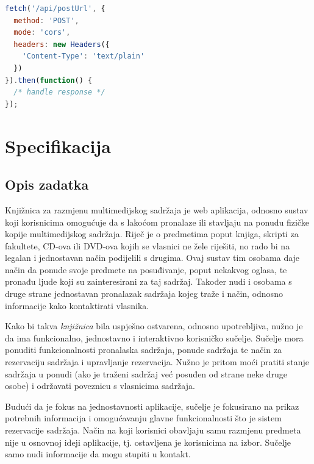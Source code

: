 \documentclass[times, utf8, zavrsni, numeric]{fer}
\newcommand{\razmakp}{\vspace{18pt}}
\newcommand{\razmaks}{\vspace{10pt}}
\begin{document}
\razmakp
\begin{lstlisting}[language=JavaScript, caption={Primjer slanja resursa s Fetch API}, label={lst:fetch_post}]
fetch('/api/postUrl', {
  method: 'POST', 
  mode: 'cors', 
  headers: new Headers({
    'Content-Type': 'text/plain'
  })
}).then(function() {
  /* handle response */
});
\end{lstlisting}
\razmaks



\chapter{Specifikacija}

\section{Opis zadatka}

Knjižnica za razmjenu multimedijskog sadržaja je web aplikacija, odnosno sustav koji korisnicima omogućuje da s lakoćom pronalaze ili stavljaju na ponudu fizičke kopije multimedijskog sadržaja.
Riječ je o predmetima poput knjiga, skripti za fakultete, CD-ova ili DVD-ova kojih se vlasnici ne žele riješiti, no rado bi na legalan i jednostavan način podijelili s drugima.
Ovaj sustav tim osobama daje način da ponude svoje predmete na posuđivanje, poput nekakvog oglasa, te pronađu ljude koji su zainteresirani za taj sadržaj.
Također nudi i osobama s druge strane jednostavan pronalazak sadržaja kojeg traže i način, odnosno informacije kako kontaktirati vlasnika.

\razmakp

Kako bi takva \emph{knjižnica} bila uspješno ostvarena, odnosno upotrebljiva, nužno je da ima funkcionalno, jednostavno i interaktivno korisničko sučelje.
Sučelje mora ponuditi funkcionalnosti pronalaska sadržaja, ponude sadržaja te način za rezervaciju sadržaja i upravljanje rezervacija.
Nužno je pritom moći pratiti stanje sadržaja u ponudi (ako je traženi sadržaj već posuđen od strane neke druge osobe) i održavati poveznicu s vlasnicima sadržaja.

Budući da je fokus na jednostavnosti aplikacije, sučelje je fokusirano na prikaz potrebnih informacija i omogućavanju glavne funkcionalnosti što je sistem rezervacije sadržaja.
Način na koji korisnici obavljaju samu razmjenu predmeta nije u osnovnoj ideji aplikacije, tj. ostavljena je korisnicima na izbor.
Sučelje samo nudi informacije da mogu stupiti u kontakt.
\end{document}
